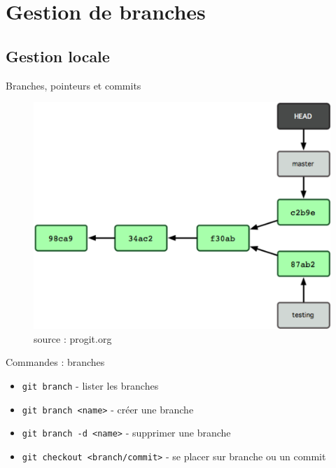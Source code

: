 \documentclass{beamer}
\begin{document}

\section{Gestion de branches}
\subsection*{Gestion locale}
\begin{frame}{Branches, pointeurs et commits}
  \begin{figure}
    \begin{center}
      \includegraphics[scale=0.8]{img/Branch1.png}
    \end{center}
    \caption{source : progit.org}
  \end{figure}
\end{frame}

\begin{frame}[containsverbatim]{Commandes : branches}
  \begin{itemize}
  \item \lstinline|git branch| - lister les branches
  \item \lstinline|git branch <name>| - créer une branche
  \item \lstinline|git branch -d <name>| - supprimer une branche
  \item \lstinline|git checkout <branch/commit>| - se placer sur branche ou un commit
  \end{itemize}
\end{frame}
\end{document}
